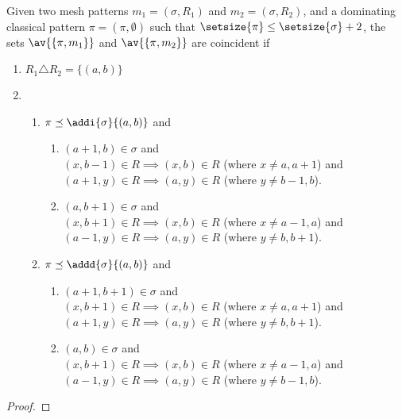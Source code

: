 \begin{proposition}
    \label{prop:dom2}
    Given two mesh patterns \(m_1 =(\sigma, R_1)\) and \(m_2 = (\sigma, R_2)\),
    and a dominating classical pattern \(\pi = (\pi,\emptyset)\) such that
    \(\setsize{\pi} \le \setsize{\sigma} + 2\), the sets \(\av{\{\pi,m_1\}}\) and
    \(\av{\{\pi,m_2\}}\) are coincident if

    \begin{enumerate}
        \item \(R_1 \triangle R_2 = \{(a,b)\}\)
        \item   \begin{enumerate}
                    \item \(\pi \preceq \addi{\sigma}{(a,b)}\) and
                        \begin{enumerate}
                            \item \((a+1,b) \in \sigma\) and \\
                                \((x,b-1)\in R \implies (x,b) \in R \) (where \(x\neq a,a+1\)) and\\
                                  \((a+1,y)\in R \implies (a,y) \in R\) (where \(y\neq b-1,b\)).
                            \item \((a,b+1) \in \sigma\) and \\
                                  \((x,b+1)\in R \implies (x,b) \in R\) (where \(x\neq a-1,a\)) and\\
                                  \((a-1,y)\in R \implies (a,y) \in R\) (where \(y\neq b,b+1\)).
                        \end{enumerate}
                    \item \(\pi \preceq \addd{\sigma}{(a,b)}\) and
                        \begin{enumerate}
                            \item \((a+1,b+1) \in \sigma\) and \\
                                  \((x,b+1)\in R \implies (x,b) \in R\) (where \(x\neq a,a+1\)) and\\
                                  \((a+1,y)\in R \implies (a,y) \in R\) (where \(y\neq b,b+1\)).
                            \item \((a,b) \in \sigma\) and \\
                                  \((x,b+1)\in R \implies (x,b) \in R\) (where \(x\neq a-1,a\)) and\\
                                  \((a-1,y)\in R \implies (a,y) \in R\)  (where \(y\neq b-1,b\)).
                        \end{enumerate}
                \end{enumerate}
    \end{enumerate}
\end{proposition}
\begin{proof}
\end{proof}

